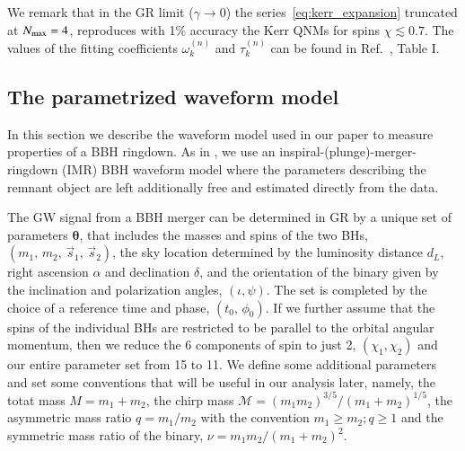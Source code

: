 \documentclass[twocolumn,
               prd,
               aps,
               superscriptaddress,
               tightenlines,
               nofootinbib,
               eqsecnum,
               amsfonts,
               amsmath,
               longbibliography]{revtex4-1}
\newcommand{\hs}[1]{{\textcolor{blue}{{[HS: #1]}} }}
\begin{document}
We remark that in the GR limit ($\gamma \to 0$)
the series~\eqref{eq:kerr_expansion} truncated at $N_{\rm max} = 4$, reproduces with 1\% accuracy
the Kerr QNMs for spins $\chi \lesssim 0.7$.
%
The values of the fitting coefficients $\omega_{k}^{(n)}$ and $\tau_{k}^{(n)}$
can be found in Ref.~\cite{Maselli:2019mjd}, Table I.


\subsection{The parametrized waveform model}
\label{sec:review_pSEOB}

In this section we describe the waveform model used in our paper to measure properties of a BBH ringdown. As in \cite{Brito:2018rfr,Ghosh:2021mrv}, we use an inspiral-(plunge)-merger-ringdown (IMR) BBH waveform model where the parameters describing the remnant object are left additionally free and estimated directly from the data.

The GW signal from a BBH merger can be determined in GR by a unique set of parameters $\bm{\theta}$, that
includes the masses and spins of the two BHs, $(m_1,\, m_2,\, \vec{s}_1,\, \vec{s}_2)$, the sky location determined by the luminosity distance $d_L$, right ascension $\alpha$ and declination $\delta$, and the orientation of the binary given by the inclination and polarization angles, $(\iota, \psi)$. The set is completed by the choice of a reference time and phase, $(t_0,\, \phi_0)$. If we further assume that the spins of the individual BHs are restricted to be parallel to the orbital angular momentum, then we reduce the 6 components of spin to just 2, $(\chi_1, \chi_2)$ and our entire parameter set from 15 to 11. We define some additional parameters and set some conventions that will be useful in our analysis later, namely, the totat mass $M=m_1+m_2$, the chirp mass $\mathcal {M}=(m_{1}m_{2})^{3/5}/(m_{1}+m_{2})^{1/5}$, the asymmetric mass ratio $q=m_1/m_2$ with the convention $m_1 \geqslant m_2; q \geqslant 1$ and the symmetric mass ratio of the binary, $\nu = m_1m_2/(m_1+m_2)^2$.
\end{document}

